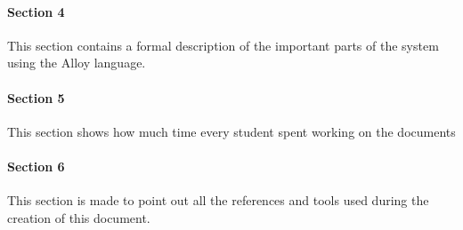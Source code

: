 \paragraph{Section 4}
This section contains a formal description of the important parts of the system using
the Alloy language. 
\paragraph{Section 5}
This section shows how much time every student spent working on the documents
\paragraph{Section 6}
This section is made to point out all the references and tools used during the
creation of this document.